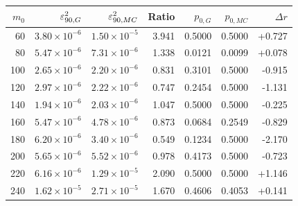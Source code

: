 \begin{tabular}{rrrrrrr}
\toprule
$m_0$ & $\varepsilon^2_{90,G}$ & $\varepsilon^2_{90,MC}$ & Ratio & $p_{0,G}$ & $p_{0,MC}$ & $\Delta r$ \\
\midrule
60 & $3.80\times10^{-6}$ & $1.50\times10^{-5}$ & 3.941 & 0.5000 & 0.5000 & +0.727 \\
80 & $5.47\times10^{-6}$ & $7.31\times10^{-6}$ & 1.338 & 0.0121 & 0.0099 & +0.078 \\
100 & $2.65\times10^{-6}$ & $2.20\times10^{-6}$ & 0.831 & 0.3101 & 0.5000 & -0.915 \\
120 & $2.97\times10^{-6}$ & $2.22\times10^{-6}$ & 0.747 & 0.2454 & 0.5000 & -1.131 \\
140 & $1.94\times10^{-6}$ & $2.03\times10^{-6}$ & 1.047 & 0.5000 & 0.5000 & -0.225 \\
160 & $5.47\times10^{-6}$ & $4.78\times10^{-6}$ & 0.873 & 0.0684 & 0.2549 & -0.829 \\
180 & $6.20\times10^{-6}$ & $3.40\times10^{-6}$ & 0.549 & 0.1234 & 0.5000 & -2.170 \\
200 & $5.65\times10^{-6}$ & $5.52\times10^{-6}$ & 0.978 & 0.4173 & 0.5000 & -0.723 \\
220 & $6.16\times10^{-6}$ & $1.29\times10^{-5}$ & 2.090 & 0.5000 & 0.5000 & +1.146 \\
240 & $1.62\times10^{-5}$ & $2.71\times10^{-5}$ & 1.670 & 0.4606 & 0.4053 & +0.141 \\
\bottomrule
\end{tabular}

